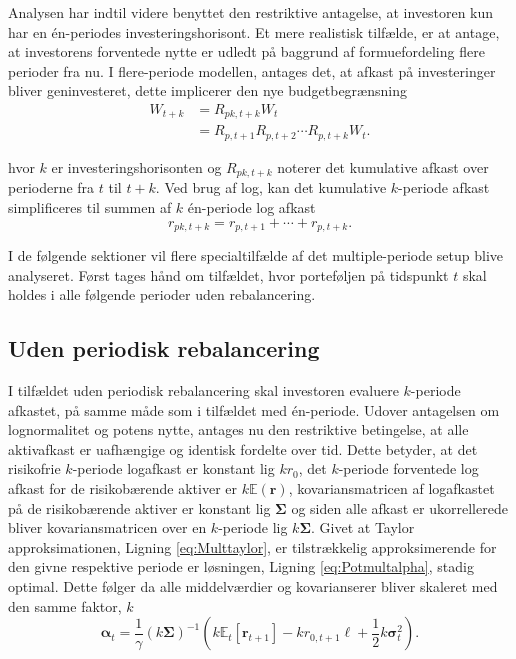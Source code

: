 \documentclass[
  a4paper,
  oneside]{memoir}
\begin{document}
Analysen har indtil videre benyttet den restriktive antagelse, at investoren kun har en én-periodes investeringshorisont. Et mere realistisk tilfælde, er at antage, at investorens forventede nytte er udledt på baggrund af formuefordeling flere perioder fra nu. I flere-periode modellen, antages det, at afkast på investeringer bliver geninvesteret, dette implicerer den nye budgetbegrænsning
\begin{align*}
W_{t+k}&=R_{pk,t+k}W_t\\
&=R_{p,t+1}R_{p,t+2}\cdots R_{p,t+k}W_t.
\end{align*}

hvor \(k\) er investeringshorisonten og \(R_{pk,t+k}\) noterer det kumulative afkast over perioderne fra \(t\) til \(t+k\). Ved brug af log, kan det kumulative \(k\)-periode afkast simplificeres til summen af \(k\) én-periode log afkast
\begin{equation}
r_{pk,t+k}=r_{p,t+1}+\cdots+r_{p,t+k}. \label{eq:sumportk}
\end{equation}

I de følgende sektioner vil flere specialtilfælde af det multiple-periode setup blive analyseret. Først tages hånd om tilfældet, hvor porteføljen på tidspunkt \(t\) skal holdes i alle følgende perioder uden rebalancering.

\hypertarget{uden-periodisk-rebalancering}{%
\subsection{Uden periodisk rebalancering}\label{uden-periodisk-rebalancering}}

I tilfældet uden periodisk rebalancering skal investoren evaluere \(k\)-periode afkastet, på samme måde som i tilfældet med én-periode. Udover antagelsen om lognormalitet og potens nytte, antages nu den restriktive betingelse, at alle aktivafkast er uafhængige og identisk fordelte over tid. Dette betyder, at det risikofrie \(k\)-periode logafkast er konstant lig \(kr_{0}\), det \(k\)-periode forventede log afkast for de risikobærende aktiver er \(k\mathbb{E}(\bm{r})\), kovariansmatricen af logafkastet på de risikobærende aktiver er konstant lig \(\bm{\Sigma}\) og siden alle afkast er ukorrellerede bliver kovariansmatricen over en \(k\)-periode lig \(k\bm{\Sigma}\). Givet at Taylor approksimationen, Ligning \eqref{eq:Multtaylor}, er tilstrækkelig approksimerende for den givne respektive periode er løsningen, Ligning \eqref{eq:Potmultalpha}, stadig optimal. Dette følger da alle middelværdier og kovarianserer bliver skaleret med den samme faktor, \(k\)
\begin{equation}
\bm{\alpha}_t=\frac{1}{\gamma}(k\bm{\Sigma})^{-1}\left(k\mathbb{E}_t[\bm{r}_{t+1}]-kr_{0,t+1}\bm{\ell}+\frac{1}{2}k\bm{\sigma}_t^2\right). \label{eq:Potmultalphak}
\end{equation}
\end{document}

